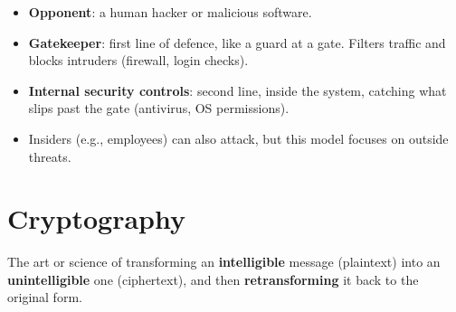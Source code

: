 \documentclass[10pt,a4paper]{article}
\begin{document}
\begin{center}
\end{center}

\begin{itemize}
  \item \textbf{Opponent}: a human hacker or malicious software.
  \item \textbf{Gatekeeper}: first line of defence, like a guard at a gate. Filters traffic and blocks intruders (firewall, login checks).
  \item \textbf{Internal security controls}: second line, inside the system, catching what slips past the gate (antivirus, OS permissions).
  \item Insiders (e.g., employees) can also attack, but this model focuses on outside threats.
\end{itemize}

\section{Cryptography}

\begin{keybox}[title=Definition]
The art or science of transforming an \textbf{intelligible} message (plaintext) into an \textbf{unintelligible} one (ciphertext), and then \textbf{retransforming} it back to the original form.
\end{keybox}
\end{document}
